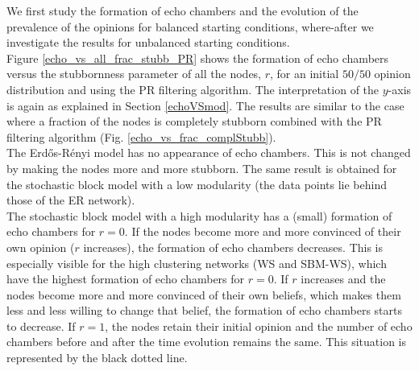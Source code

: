 \documentclass[11 pt , letterpaper , twoside , openright]{book}
\begin{document}
\newline
We first study the formation of echo chambers and the evolution of the prevalence of the opinions for balanced starting conditions, where-after we investigate the results for unbalanced starting conditions.\\
\newline
Figure \ref{echo_vs_all_frac_stubb_PR} shows the formation of echo chambers versus the stubbornness parameter of all the nodes, $r$, for an initial $50/50$ opinion distribution and using the PR filtering algorithm. The interpretation of the $y$-axis is again as explained in Section \ref{echoVSmod}. The results are similar to the case where a fraction of the nodes is completely stubborn combined with the PR filtering algorithm (Fig. \ref{echo_vs_frac_complStubb}).\\
\newline
The Erd\H{o}s-R\'{e}nyi model has no appearance of echo chambers. This is not changed by making the nodes more and more stubborn. The same result is obtained for the stochastic block model with a low modularity (the data points lie behind those of the ER network).\\
\newline
The stochastic block model with a high modularity has a (small) formation of echo chambers for $r=0$. If the nodes become more and more convinced of their own opinion ($r$ increases), the formation of echo chambers decreases. This is especially visible for the high clustering networks (WS and SBM-WS), which have the highest formation of echo chambers for $r=0$. If $r$ increases and the nodes become more and more convinced of their own beliefs, which makes them less and less willing to change that belief, the formation of echo chambers starts to decrease. If $r=1$, the nodes retain their initial opinion and the number of echo chambers before and after the time evolution remains the same. This situation is represented by the black dotted line.
\end{document}

